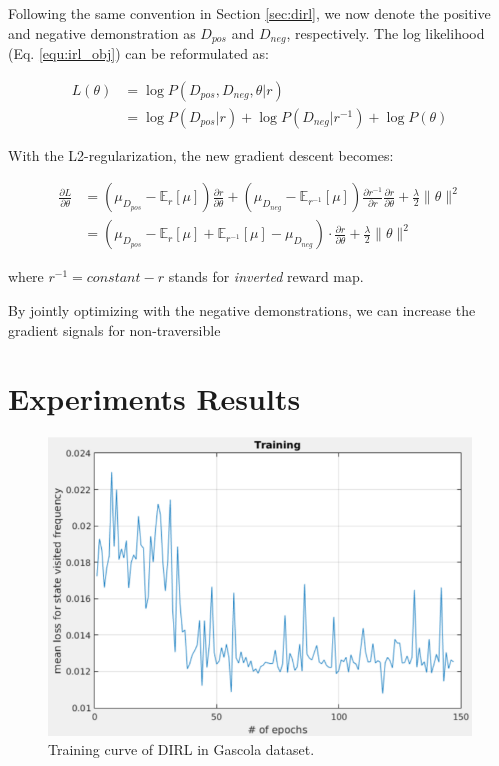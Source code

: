 \documentclass[../thesis.tex]{subfiles}
\begin{document}
Following the same convention in Section \ref{sec:dirl}, we now denote the positive and negative demonstration as $D_{pos}$ and $D_{neg}$, respectively. The log likelihood (Eq. \ref{equ:irl_obj}) can be reformulated as:

\begin{align}
L(\theta) &= \log P(D_{pos}, D_{neg},\theta|r) \\
&= \log P(D_{pos}|r) + \log P(D_{neg}|r^{-1}) + \log P(\theta)
\end{align}

With the L2-regularization, the new gradient descent becomes:

\begin{align}
\frac{\partial L}{\partial \theta} &= \left( \mu_{D_{pos}} - \mathbb{E}_{r}[\mu] \right) \frac{\partial r}{\partial \theta} + \left( \mu_{D_{neg}} - \mathbb{E}_{r^{-1}}[\mu] \right) \frac{\partial r^{-1}}{\partial r} \frac{\partial r}{\partial \theta} + \frac{\lambda}{2} \| \theta \|^2 \\
&= \left( \mu_{D_{pos}} - \mathbb{E}_{r}[\mu] + \mathbb{E}_{r^{-1}}[\mu] - \mu_{D_{neg}} \right) \cdot \frac{\partial r}{\partial \theta} + \frac{\lambda}{2} \| \theta \|^2
\end{align}

where $r^{-1} = constant - r $ stands for \textit{inverted} reward map. 

By jointly optimizing with the negative demonstrations, we can increase the gradient signals for non-traversible 


\section{Experiments Results}


\begin{figure}[t]
	\begin{center}
		\centerline{\includegraphics[width=0.3\columnwidth]{./DIRL/fig/dirl_training_curve.png}}
		\caption{Training curve of DIRL in Gascola dataset.}
		\label{fig:dirl_learning_curve}
	\end{center}
\end{figure} 
\end{document}

